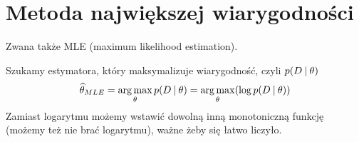 \section{Metoda największej wiarygodności}

Zwana także MLE (maximum likelihood estimation).

Szukamy estymatora, który maksymalizuje wiarygodność, czyli \( p(D \:\vert\: \theta) \)
\[
	\mle{\theta} = \argmax_{\theta} p(D \given \theta) = \argmax_{\theta} \pars{\log p(D \given \theta)}
\]
Zamiast logarytmu możemy wstawić dowolną inną monotoniczną funkcję (możemy też nie brać logarytmu), ważne żeby się łatwo liczyło.
